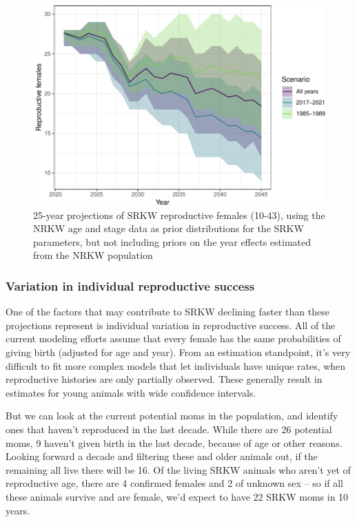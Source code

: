 \documentclass[]{article}
\begin{document}
\begin{figure}
\centering
\includegraphics{status_update_files/figure-latex/proj3-1.pdf}
\caption{25-year projections of SRKW reproductive females (10-43), using
the NRKW age and stage data as prior distributions for the SRKW
parameters, but not including priors on the year effects estimated from
the NRKW population \label{fig:proj3}}
\end{figure}

\hypertarget{variation-in-individual-reproductive-success}{%
\subsubsection{Variation in individual reproductive
success}\label{variation-in-individual-reproductive-success}}

One of the factors that may contribute to SRKW declining faster than
these projections represent is individual variation in reproductive
success. All of the current modeling efforts assume that every female
has the same probabilities of giving birth (adjusted for age and year).
From an estimation standpoint, it's very difficult to fit more complex
models that let individuals have unique rates, when reproductive
histories are only partially observed. These generally result in
estimates for young animals with wide confidence intervals.

But we can look at the current potential moms in the population, and
identify ones that haven't reproduced in the last decade. While there
are 26 potential moms, 9 haven't given birth in the last decade, because
of age or other reasons. Looking forward a decade and filtering these
and older animals out, if the remaining all live there will be 16. Of
the living SRKW animals who aren't yet of reproductive age, there are 4
confirmed females and 2 of unknown sex -- so if all these animals
survive and are female, we'd expect to have 22 SRKW moms in 10 years.
\end{document}
